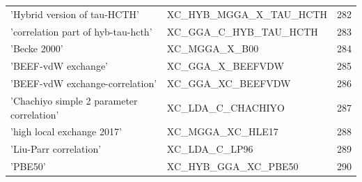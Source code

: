 \documentclass[final,12pt]{article}
\begin{document}
{{{{{{\begin{table}[!h]
\begin{center}
\begin{tabular}{llr}
  'Hybrid version of tau-HCTH' & XC\_HYB\_MGGA\_X\_TAU\_HCTH  &282\\
  'correlation part of hyb-tau-hcth' & XC\_GGA\_C\_HYB\_TAU\_HCTH  &283\\
  'Becke 2000' & XC\_MGGA\_X\_B00  &284\\
  'BEEF-vdW exchange' & XC\_GGA\_X\_BEEFVDW  &285\\
  'BEEF-vdW exchange-correlation' & XC\_GGA\_XC\_BEEFVDW  &286\\
  'Chachiyo simple 2 parameter correlation' & XC\_LDA\_C\_CHACHIYO  &287\\
  'high local exchange 2017' & XC\_MGGA\_XC\_HLE17  &288\\
  'Liu-Parr correlation' & XC\_LDA\_C\_LP96  &289\\
  'PBE50' & XC\_HYB\_GGA\_XC\_PBE50  &290\\
\hline
\hline
\end{tabular}
\end{center}
\end{table}

}}}}}}
\end{document}

